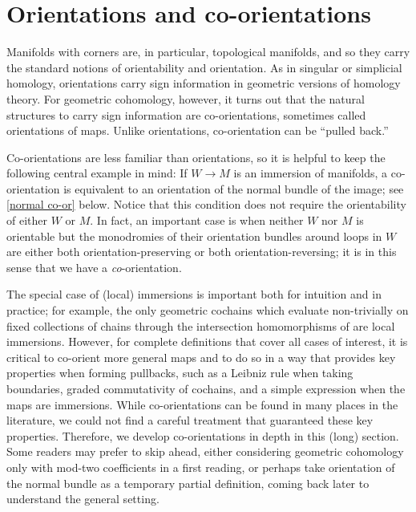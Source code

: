 


\section{Orientations and co-orientations}\label{S: orientations and co-orientations}

Manifolds with corners are, in particular, topological manifolds, and so they carry the standard notions of orientability and orientation. As in singular or simplicial homology, orientations carry sign information in geometric versions of homology theory. For geometric cohomology, however, it turns out that the natural structures to carry sign information are co-orientations, sometimes called orientations of maps. Unlike orientations, co-orientation can be ``pulled back.''

Co-orientations are less familiar than orientations, so it is helpful to keep the following central example in mind: If $W\to M$ is an  immersion of manifolds, a co-orientation is equivalent to an
orientation of the normal bundle of the image; see \cref{normal co-or} below. Notice that this condition does not require the orientability of either $W$ or $M$. In fact, an important case is when neither $W$ nor $M$ is orientable but the monodromies of their orientation bundles around loops in $W$ are either both orientation-preserving or both orientation-reversing; it is in this sense that we have a {\it co}-orientation. 

The special case of (local) immersions is important both for intuition and in practice; for example, the only geometric cochains which evaluate non-trivially on fixed collections of chains through the intersection homomorphisms of \cite{FMS-flows} are local immersions.  However, for complete definitions that cover all cases of  interest, it is critical to co-orient more general maps and to do so in a way that provides key properties when forming pullbacks, such as a Leibniz rule when taking boundaries, graded commutativity of cochains, and a simple expression when the maps are immersions. 
While co-orientations can be found in many places in the literature, we could not find a careful treatment that guaranteed these key properties. Therefore, we develop co-orientations in depth in this (long) section. 
Some readers may prefer to skip ahead, either considering geometric cohomology only with mod-two coefficients in a first reading, or perhaps take orientation of the normal bundle as a temporary partial definition, coming back later to understand the general setting.


